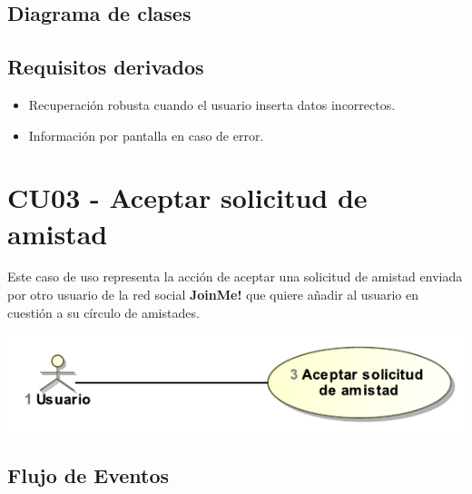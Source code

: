 \documentclass[12pt, a4paper, titlepage]{article}
\begin{document}
\subsection{Diagrama de clases}


\subsection{Requisitos derivados}

\begin{itemize}
	\item Recuperación robusta cuando el usuario inserta datos incorrectos.
	\item Información por pantalla en caso de error.
\end{itemize}

\section{CU03 - Aceptar solicitud de amistad}


Este caso de uso representa la acción de aceptar una solicitud de amistad enviada por otro usuario de la red social \textbf{JoinMe!} que quiere añadir al usuario en cuestión a su círculo de amistades.

\begin{center}
	\includegraphics{Imagenes/AceptarSolicitudAmistadCU.pdf}
\end{center}
\subsection{Flujo de Eventos}



\end{document}
